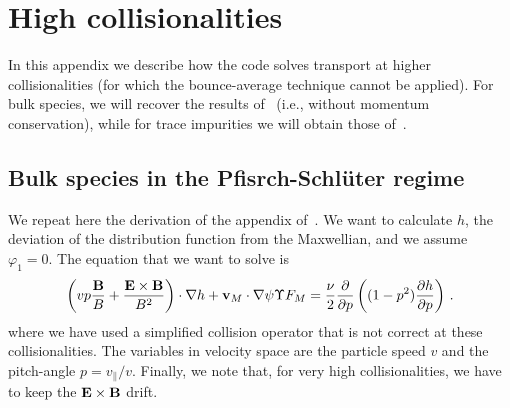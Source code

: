 \chapter{High collisionalities}\label{CHAP_HIGHCOL}

In this appendix we describe how the code solves transport at higher collisionalities (for which the bounce-average technique cannot be applied). For bulk species, we will recover the results of \DKES~(i.e., without momentum conservation), while for trace impurities we will obtain those of~\citep{calvo2018nf}.


\section{Bulk species in the Pfisrch-Schl\"uter regime}

We repeat here the derivation of the appendix of~\citep{igitkhanov2006impurity}.  We want to calculate $h$, the deviation of the distribution function from the Maxwellian, and we assume $\varphi_1=0$. The equation that we want to solve is
\begin{equation}
\left(vp\frac{\mathbf{B}}{B}+\frac{\mathbf{E}\times\mathbf{B}}{B^2}\right)\cdot\mathbf{\nabla} h + {\mathbf{v}}_M\cdot\mathbf{\nabla}\psi \Upsilon F_M = \frac{\nu}{2}\frac{\partial}{\partial p}\left((1-p^2)\frac{\partial h}{\partial p}\right)\,.\label{EQ_DKEPS}
\end{equation}
where we have used a simplified collision operator that is not correct at these collisionalities. The variables in velocity space are the particle speed $v$ and the pitch-angle $p=v_\parallel/v$. Finally, we note that, for very high collisionalities, we have to keep the $\mathbf{E}\times\mathbf{B}$ drift. 

